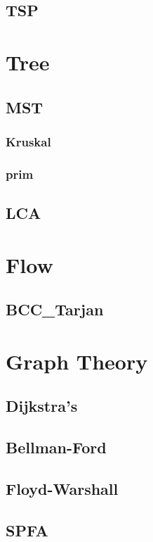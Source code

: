 	\subsection{TSP}
		
\section{Tree}
	\subsection{MST}
        \subsubsection{Kruskal}
            
        \subsubsection{prim}
            
	\subsection{LCA}
		
\section{Flow}
	\subsection{BCC\_Tarjan}
		
\section{Graph Theory}
	\subsection{Dijkstra’s}
		
	\subsection{Bellman-Ford}
		
	\subsection{Floyd-Warshall}
		
	\subsection{SPFA}
		
